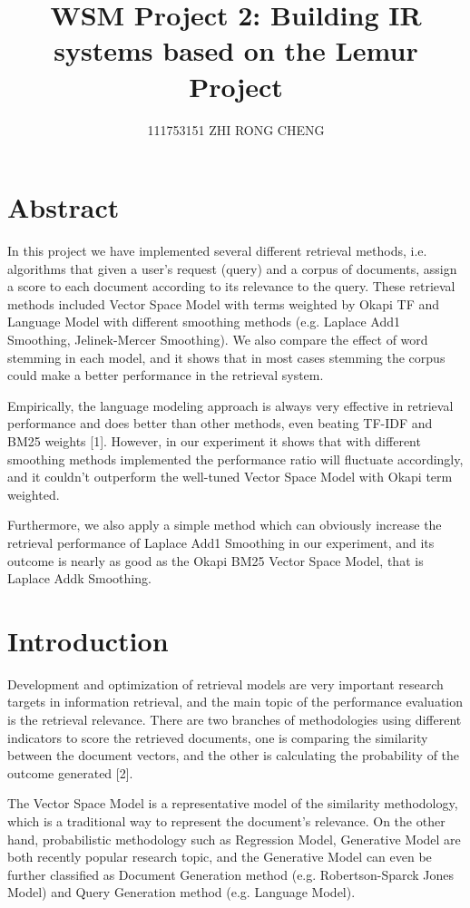 \documentclass{article}
\title{WSM Project 2: Building IR systems based on the Lemur Project}
\author{111753151 ZHI RONG CHENG}
\begin{document}
\maketitle

\section{Abstract}
In this project we have implemented several different retrieval methods, i.e. algorithms that given a user's request (query) and a corpus of documents, assign a score to each document according to its relevance to the query. These retrieval methods included Vector Space Model with terms weighted by Okapi TF and Language Model with different smoothing methods (e.g. Laplace Add1 Smoothing, Jelinek-Mercer Smoothing). We also compare the effect of word stemming in each model, and it shows that in most cases stemming the corpus could make a better performance in the retrieval system.

Empirically, the language modeling approach is always very effective in retrieval performance and does better than other methods, even beating TF-IDF and BM25 weights [1]. However, in our experiment it shows that with different smoothing methods implemented the performance ratio will fluctuate accordingly, and it couldn't outperform the well-tuned Vector Space Model with Okapi term weighted.

Furthermore, we also apply a simple method which can obviously increase the retrieval performance of Laplace Add1 Smoothing in our experiment, and its outcome is nearly as good as the Okapi BM25 Vector Space Model, that is Laplace Addk Smoothing.


\section{Introduction}
Development and optimization of retrieval models are very important research targets in information retrieval, and the main topic of the performance evaluation is the retrieval relevance. There are two branches of methodologies using different indicators to score the retrieved documents, one is comparing the similarity between the document vectors, and the other is calculating the probability of the outcome generated [2]. 

The Vector Space Model is a representative model of the similarity methodology, which is a traditional way to represent the document's relevance. On the other hand, probabilistic methodology such as Regression Model, Generative Model are both recently popular research topic, and the Generative Model can even be further classified as Document Generation method (e.g. Robertson-Sparck Jones Model) and Query Generation method (e.g. Language Model). 
\end{document}
